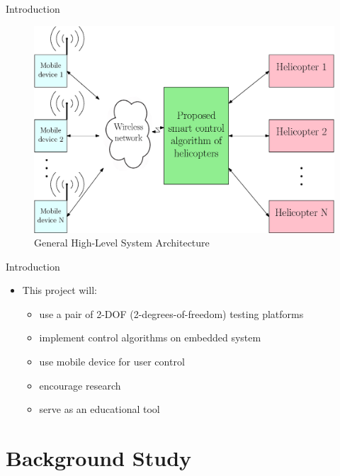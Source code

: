 \documentclass{beamer}
\begin{document}
\begin{frame}{Introduction}{} %
\begin{figure}
  \centering
  \includegraphics[scale=0.31]{figs/ipe/ProblemStatementImageWhite}
  \caption{General High-Level System Architecture}
  \label{fig:ProblemStatementImage}
\end{figure}
\end{frame}

\begin{frame}{Introduction}{} %
        \begin{itemize}
        \item This project will:
            \begin{itemize}
                \item use a pair of 2-DOF (2-degrees-of-freedom) testing platforms
                \item implement control algorithms on embedded system
                \item use mobile device for user control
                \item encourage research
                \item serve as an educational tool
            \end{itemize}
        \end{itemize}
\end{frame}


\section{Background Study}
\end{document}

